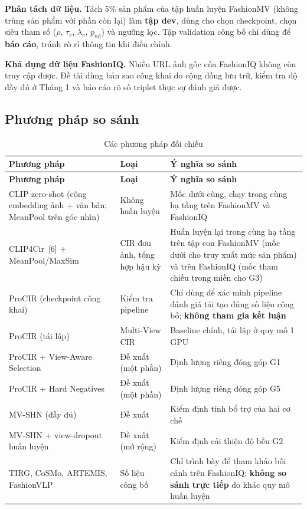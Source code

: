 \documentclass[a4paper]{article}
\begin{document}
\textbf{Phân tách dữ liệu.} Tách 5\% sản phẩm của tập huấn luyện FashionMV (không trùng sản phẩm với phần còn lại) làm \textbf{tập dev}, dùng cho chọn checkpoint, chọn siêu tham số ($\rho$, $\tau_c$, $\lambda_v$, $p_{\text{vd}}$) và ngưỡng lọc. Tập validation công bố chỉ dùng để \textbf{báo cáo}, tránh rò rỉ thông tin khi điều chỉnh.

\textbf{Khả dụng dữ liệu FashionIQ.} Nhiều URL ảnh gốc của FashionIQ không còn truy cập được. Đề tài dùng bản sao công khai do cộng đồng lưu trữ, kiểm tra độ đầy đủ ở Tháng 1 và báo cáo rõ số triplet thực sự đánh giá được.

\subsection{Phương pháp so sánh}

\begin{longtable}{L{4.2cm}L{3.3cm}L{7.7cm}}
\caption{Các phương pháp đối chiếu}\label{tab:cmp}\\
\toprule
\textbf{Phương pháp} & \textbf{Loại} & \textbf{Ý nghĩa so sánh}\\
\midrule\endfirsthead
\toprule
\textbf{Phương pháp} & \textbf{Loại} & \textbf{Ý nghĩa so sánh}\\
\midrule\endhead
CLIP zero-shot (cộng embedding ảnh + văn bản; MeanPool trên góc nhìn) & Không huấn luyện & Mốc dưới cùng, chạy trong cùng hạ tầng trên FashionMV và FashionIQ\\
CLIP4Cir~[6] + MeanPool/MaxSim & CIR đơn ảnh, tổng hợp hậu kỳ & Huấn luyện lại trong cùng hạ tầng trên tập con FashionMV (mốc dưới cho truy xuất mức sản phẩm) và trên FashionIQ (mốc tham chiếu trong miền cho G3)\\
ProCIR (checkpoint công khai) & Kiểm tra pipeline & Chỉ dùng để xác minh pipeline đánh giá tái tạo đúng số liệu công bố; \textbf{không tham gia kết luận}\\
ProCIR (tái lập) & Multi-View CIR & Baseline chính, tái lập ở quy mô 1 GPU\\
ProCIR + View-Aware Selection & Đề xuất (một phần) & Định lượng riêng đóng góp G1\\
ProCIR + Hard Negatives & Đề xuất (một phần) & Định lượng riêng đóng góp G5\\
MV-SHN (đầy đủ) & Đề xuất & Kiểm định tính bổ trợ của hai cơ chế\\
MV-SHN + view-dropout huấn luyện & Đề xuất (mở rộng) & Kiểm định cải thiện độ bền G2\\
TIRG, CoSMo, ARTEMIS, FashionVLP & Số liệu công bố & Chỉ trình bày để tham khảo bối cảnh trên FashionIQ; \textbf{không so sánh trực tiếp} do khác quy mô huấn luyện\\
\bottomrule
\end{longtable}
\end{document}
